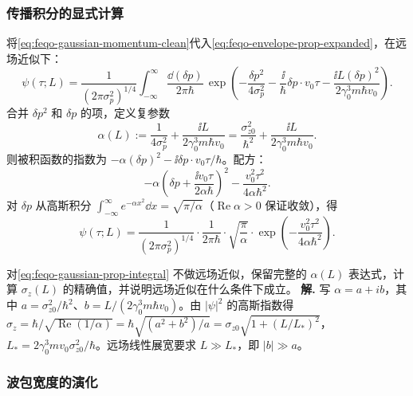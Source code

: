 \subsubsection{传播积分的显式计算}

将\cref{eq:feqo-gaussian-momentum-clean}代入\cref{eq:feqo-envelope-prop-expanded}，在远场近似下：
\begin{equation}
\psi(\tau;L)=\frac{1}{(2\pi\sigma_p^2)^{1/4}}
\int_{-\infty}^{\infty}\frac{\dd(\delta p)}{2\pi\hbar}\,
\exp\!\left(-\frac{\delta p^2}{4\sigma_p^2}
-\frac{\ii}{\hbar}\delta p\cdot v_0\tau
-\frac{\ii L(\delta p)^2}{2\gamma_0^3 m\hbar v_0}\right).
\label{eq:feqo-gaussian-prop-integral}
\end{equation}
合并 $\delta p^2$ 和 $\delta p$ 的项，定义复参数
\begin{equation}
\alpha(L):=\frac{1}{4\sigma_p^2}+\frac{\ii L}{2\gamma_0^3 m\hbar v_0}
=\frac{\sigma_{z0}^2}{\hbar^2}+\frac{\ii L}{2\gamma_0^3 m\hbar v_0}.
\label{eq:feqo-alpha-def}
\end{equation}
则被积函数的指数为 $-\alpha(\delta p)^2 - \ii\delta p\cdot v_0\tau/\hbar$。配方：
\begin{equation}
-\alpha\left(\delta p+\frac{\ii v_0\tau}{2\alpha\hbar}\right)^2
-\frac{v_0^2\tau^2}{4\alpha\hbar^2}.
\label{eq:feqo-gaussian-complete-square}
\end{equation}
对 $\delta p$ 从高斯积分 $\int_{-\infty}^{\infty}e^{-\alpha x^2}\dd x=\sqrt{\pi/\alpha}$（$\operatorname{Re}\alpha>0$ 保证收敛），得
\begin{equation}
\psi(\tau;L)=\frac{1}{(2\pi\sigma_p^2)^{1/4}}\cdot\frac{1}{2\pi\hbar}
\cdot\sqrt{\frac{\pi}{\alpha}}\cdot
\exp\!\left(-\frac{v_0^2\tau^2}{4\alpha\hbar^2}\right).
\label{eq:feqo-gaussian-prop-result}
\end{equation}


\par
\begin{workedexample}
对\cref{eq:feqo-gaussian-prop-integral} 不做远场近似，保留完整的 $\alpha(L)$ 表达式，计算 $\sigma_z(L)$ 的精确值，并说明远场近似在什么条件下成立。
\textbf{解.} 写 $\alpha=a+ib$，其中 $a=\sigma_{z0}^2/\hbar^2$、$b=L/(2\gamma_0^3m\hbar v_0)$。由 $|\psi|^2$ 的高斯指数得 $\sigma_z=\hbar/\sqrt{\operatorname{Re}(1/\alpha)}=\hbar\sqrt{(a^2+b^2)/a}=\sigma_{z0}\sqrt{1+(L/L_*)^2}$，$L_*=2\gamma_0^3mv_0\sigma_{z0}^2/\hbar$。远场线性展宽要求 $L\gg L_*$，即 $|b|\gg a$。
\end{workedexample}
\par
\subsubsection{波包宽度的演化}

